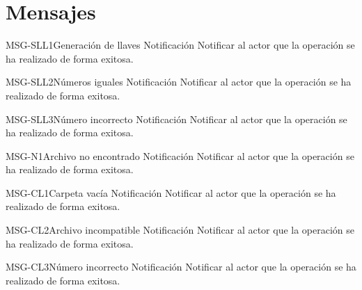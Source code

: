 \section{Mensajes}

\begin{Message}{MSG-SLL1}{Generación de llaves} 
	\MSGitem[Tipo: ] Notificación
	\MSGitem[Objetivo: ] Notificar al actor que la operación se ha realizado de forma exitosa.
	\MSGitem[Redacción: ]
	\MSGitem[Ejemplo: ] 
\end{Message}

\begin{Message}{MSG-SLL2}{Números iguales} 
	\MSGitem[Tipo: ] Notificación
	\MSGitem[Objetivo: ] Notificar al actor que la operación se ha realizado de forma exitosa.
	\MSGitem[Redacción: ]
	\MSGitem[Ejemplo: ] 
\end{Message}

\begin{Message}{MSG-SLL3}{Número incorrecto} 
	\MSGitem[Tipo: ] Notificación
	\MSGitem[Objetivo: ] Notificar al actor que la operación se ha realizado de forma exitosa.
	\MSGitem[Redacción: ]
	\MSGitem[Ejemplo: ] 
\end{Message}

\begin{Message}{MSG-N1}{Archivo no encontrado} 
	\MSGitem[Tipo: ] Notificación
	\MSGitem[Objetivo: ] Notificar al actor que la operación se ha realizado de forma exitosa.
	\MSGitem[Redacción: ]
	\MSGitem[Ejemplo: ] 
\end{Message}

\begin{Message}{MSG-CL1}{Carpeta vacía} 
	\MSGitem[Tipo: ] Notificación
	\MSGitem[Objetivo: ] Notificar al actor que la operación se ha realizado de forma exitosa.
	\MSGitem[Redacción: ]
	\MSGitem[Ejemplo: ] 
\end{Message}

\begin{Message}{MSG-CL2}{Archivo incompatible} 
	\MSGitem[Tipo: ] Notificación
	\MSGitem[Objetivo: ] Notificar al actor que la operación se ha realizado de forma exitosa.
	\MSGitem[Redacción: ]
	\MSGitem[Ejemplo: ] 
\end{Message}

\begin{Message}{MSG-CL3}{Número incorrecto} 
	\MSGitem[Tipo: ] Notificación
	\MSGitem[Objetivo: ] Notificar al actor que la operación se ha realizado de forma exitosa.
	\MSGitem[Redacción: ]
	\MSGitem[Ejemplo: ] 
\end{Message}

